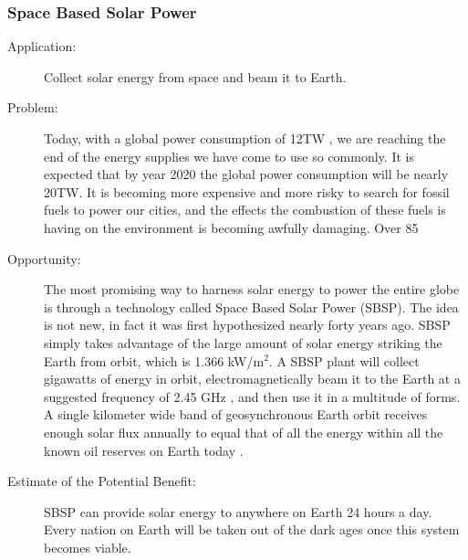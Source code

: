 \subsubsection{Space Based Solar Power}
\begin{description}  \item[Application:] Collect solar energy from space and beam it to  Earth.
 
\item[Problem:] Today, with a  global power consumption of 12TW \cite{Seboldt2004}, we are reaching the end of the  energy supplies we have come to use so commonly. It is expected that by  year 2020 the global power consumption will be nearly 20TW. It is  becoming more expensive and more risky to search for fossil fuels to  power our cities, and the effects the combustion of these fuels is  having on the environment is becoming awfully damaging. Over 85%


 
\item[Opportunity:] The most  promising way to harness solar energy to power the entire globe is  through a technology called Space Based Solar Power (SBSP). The idea is  not new, in fact it was first hypothesized nearly forty years ago. SBSP  simply takes advantage of the large amount of solar energy striking the  Earth from orbit, which is 1.366 kW/m$^2$. A SBSP plant will collect  gigawatts of energy in orbit, electromagnetically beam it to the Earth  at a suggested frequency of 2.45 GHz \cite{Chaudhary2010}, and then use it in a multitude  of forms. A single kilometer wide band of geosynchronous Earth orbit  receives enough solar flux annually to equal that of all the energy  within all the known oil reserves on Earth today \cite{NationalSpaceSociety2007}.
 
\item[Estimate of the Potential  Benefit:]SBSP can provide solar energy to anywhere on Earth 24 hours a  day. Every nation on Earth will be taken out of the dark ages once this  system becomes viable.
 

\end{description}
